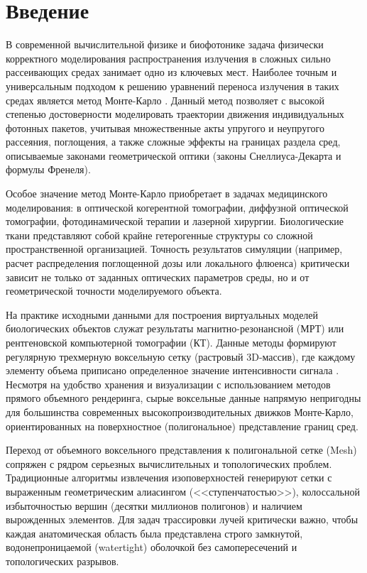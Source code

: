 \documentclass[a4paper,14pt]{article}
\begin{document}

\newpage

\tableofcontents
\newpage

\section{Введение}
В современной вычислительной физике и биофотонике задача физически корректного моделирования распространения излучения в сложных сильно рассеивающих средах занимает одно из ключевых мест. Наиболее точным и универсальным подходом к решению уравнений переноса излучения в таких средах является метод Монте-Карло \cite{wang1995}. Данный метод позволяет с высокой степенью достоверности моделировать траектории движения индивидуальных фотонных пакетов, учитывая множественные акты упругого и неупругого рассеяния, поглощения, а также сложные эффекты на границах раздела сред, описываемые законами геометрической оптики (законы Снеллиуса-Декарта и формулы Френеля).

Особое значение метод Монте-Карло приобретает в задачах медицинского моделирования: в оптической когерентной томографии, диффузной оптической томографии, фотодинамической терапии и лазерной хирургии. Биологические ткани представляют собой крайне гетерогенные структуры со сложной пространственной организацией. Точность результатов симуляции (например, расчет распределения поглощенной дозы или локального флюенса) критически зависит не только от заданных оптических параметров среды, но и от геометрической точности моделируемого объекта.

На практике исходными данными для построения виртуальных моделей биологических объектов служат результаты магнитно-резонансной (МРТ) или рентгеновской компьютерной томографии (КТ). Данные методы формируют регулярную трехмерную воксельную сетку (растровый 3D-массив), где каждому элементу объема приписано определенное значение интенсивности сигнала \cite{collins1998}. Несмотря на удобство хранения и визуализации с использованием методов прямого объемного рендеринга, сырые воксельные данные напрямую непригодны для большинства современных высокопроизводительных движков Монте-Карло, ориентированных на поверхностное (полигональное) представление границ сред.

Переход от объемного воксельного представления к полигональной сетке (Mesh) сопряжен с рядром серьезных вычислительных и топологических проблем. Традиционные алгоритмы извлечения изоповерхностей \cite{lorensen1987} генерируют сетки с выраженным геометрическим алиасингом (<<ступенчатостью>>), колоссальной избыточностью вершин (десятки миллионов полигонов) и наличием вырожденных элементов. Для задач трассировки лучей критически важно, чтобы каждая анатомическая область была представлена строго замкнутой, водонепроницаемой (watertight) оболочкой без самопересечений и топологических разрывов.
\end{document}

